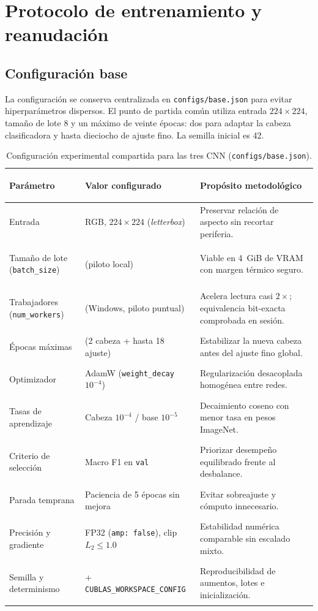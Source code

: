 \FloatBarrier\section{Protocolo de entrenamiento y reanudación}

\subsection{Configuración base}
La configuración se conserva centralizada en \texttt{configs/base.json} para evitar hiperparámetros dispersos. El punto de partida común utiliza entrada $224\times224$, tamaño de lote 8 y un máximo de veinte épocas: dos para adaptar la cabeza clasificadora y hasta dieciocho de ajuste fino. La semilla inicial es 42.

\begin{table}[htbp]\centering\small
\caption{Configuración experimental compartida para las tres CNN (\texttt{configs/base.json}).}
\begin{tabularx}{\textwidth}{@{}>{\bfseries\raggedright\arraybackslash}p{4.4cm}>{\raggedright\arraybackslash}p{4.3cm}>{\raggedright\arraybackslash}X@{}}
\toprule
\textbf{Parámetro} & \textbf{Valor configurado} & \textbf{Propósito metodológico} \\ \midrule
Entrada & RGB, $224\times224$ (\textit{letterbox}) & Preservar relación de aspecto sin recortar periferia. \\
Tamaño de lote (\texttt{batch\_size}) & 8 (piloto local) & Viable en 4~GiB de VRAM con margen térmico seguro. \\
Trabajadores (\texttt{num\_workers}) & 4 (Windows, piloto puntual) & Acelera lectura casi $2\times$; equivalencia bit-exacta comprobada en sesión. \\
Épocas máximas & 20 (2 cabeza + hasta 18 ajuste) & Estabilizar la nueva cabeza antes del ajuste fino global. \\
Optimizador & AdamW (\texttt{weight\_decay} $10^{-4}$) & Regularización desacoplada homogénea entre redes. \\
Tasas de aprendizaje & Cabeza $10^{-4}$ / base $10^{-5}$ & Decaimiento coseno con menor tasa en pesos ImageNet. \\
Criterio de selección & Macro F1 en \texttt{val} & Priorizar desempeño equilibrado frente al desbalance. \\
Parada temprana & Paciencia de 5 épocas sin mejora & Evitar sobreajuste y cómputo innecesario. \\
Precisión y gradiente & FP32 (\texttt{amp: false}), clip $L_2\le 1.0$ & Estabilidad numérica comparable sin escalado mixto. \\
Semilla y determinismo & 42 + \texttt{CUBLAS\_WORKSPACE\_CONFIG} & Reproducibilidad de aumentos, lotes e inicialización. \\
\bottomrule
\end{tabularx}
\end{table}

